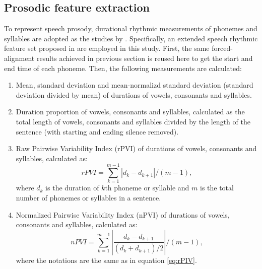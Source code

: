 \subsection{Prosodic feature extraction}
\label{sec:supraseg}

To represent speech prosody, durational rhythmic measurements of phonemes and syllables are adopted as the studies by \cite{ramus1999correlates,grabe2002durational}. Specifically, an extended speech rhythmic feature set proposed in \citep{lai2013applying} are employed in this study. First, the same forced-alignment results achieved in previous section is reused here to get the start and end time of each phoneme. Then, the following measurements are calculated:
\begin{enumerate}
\item Mean, standard deviation and mean-normalizd standard deviation (standard deviation divided by mean) of durations of vowels, consonants and syllables.
\item Duration proportion of vowels, consonants and syllables, calculated as the total length of vowels, consonants and syllables divided by the length of the sentence (with starting and ending silence removed).
\item Raw Pairwise Variability Index (rPVI) of durations of vowels, consonants and syllables, calculated as:
    \begin{equation}
    \label{eq:rPIV}
    rPVI= \sum_{k=1}^{m-1} |d_k-d_{k+1}|/(m-1),
    \end{equation}
    where $d_k$ is the duration of $k$th phoneme or syllable and $m$ is the total number of phonemes or syllables in a sentence.
\item Normalized Pairwise Variability Index (nPVI) of durations of vowels, consonants and syllables, calculated as:
    \begin{equation}
    \label{eq:nPIV}
    nPVI= \sum_{k=1}^{m-1} |\frac{d_k-d_{k+1}}{(d_k + d_{k+1})/2}|/(m-1),
    \end{equation}
    where the notations are the same as in equation \ref{eq:rPIV}.
\end{enumerate}

